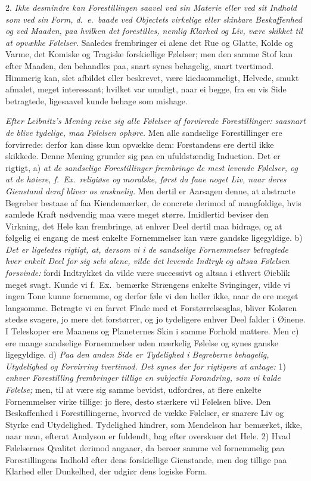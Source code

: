 \documentclass[12pt,a4paper]{article}
\newcommand{\opage}[1]{\marginnote{\footnotesize\textit{[#1]}}}
\begin{document}
2. \emph{Ikke desmindre kan Forestillingen saavel ved sin Materie eller ved sit Indhold
som ved sin Form, d.~e.\ baade ved Objectets virkelige eller skinbare Beskaffenhed og ved
Maaden, paa hvilken det forestilles, nemlig Klarhed og Liv, være skikket til at opvække
Følelser.} Saaledes frembringer ei alene det Rue og Glatte, Kolde og Varme, det Komiske og
Tragiske forskiellige Følelser; men den samme Stof kan efter Maaden, den behandles paa,
snart synes behagelig, snart tvertimod. Himmerig kan, slet afbildet eller beskrevet, være
kiedsommeligt, Helvede, smukt afmalet, meget interessant; hvilket var umuligt, naar ei
begge, fra en vis Side betragtede, ligesaavel kunde behage som mishage.

\emph{Efter Leibnitz's Mening reise sig alle Følelser af forvirrede Forestillinger:
saasnart de blive tydelige, maa Følelsen ophøre.} Men alle sandselige Forestillinger ere
forvirrede: derfor kan disse kun opvække dem: Forstandens ere dertil ikke skikkede. Denne
Mening grunder sig paa en ufuldstændig Induction. Det er rigtigt, a) \emph{at de
sandselige Forestillinger frembringe de mest levende Følelser, og at de
\opage{191} høiere, f.~Ex.\ religiøse og moralske, først da faae noget Liv, naar deres Gienstand deraf
bliver os anskuelig.} Men dertil er Aarsagen denne, at abstracte Begreber bestaae af faa
Kiendemærker, de concrete derimod af mangfoldige, hvis samlede Kraft nødvendig maa være
meget større. Imidlertid beviser den Virkning, det Hele kan frembringe, at enhver Deel
dertil maa bidrage, og at følgelig ei engang de mest enkelte Fornemmelser kan være gandske
ligegyldige. b) \emph{Det er ligeledes rigtigt, at, dersom vi i de sandselige Fornemmelser
betragtede hver enkelt Deel for sig selv alene, vilde det levende Indtryk og altsaa
Følelsen forsvinde:} fordi Indtrykket da vilde være successivt og altsaa i ethvert Øieblik
meget svagt. Kunde vi f.~Ex.\ bemærke Strængens enkelte Svinginger, vilde vi ingen Tone
kunne fornemme, og derfor føle vi den heller ikke, naar de ere meget langsomme. Betragte
vi en farvet Flade med et Forstørrelsesglas, bliver Koløren stedse svagere, jo mere det
forstørrer, og jo tydeligere enhver Deel falder i Øinene. I Teleskoper ere Maanens og
Planeternes Skin i samme Forhold mattere. Men c) ere mange sandselige Fornemmelser uden
mærkelig Følelse og synes ganske ligegyldige. d) \emph{Paa den anden Side er Tydelighed i
Begreberne behagelig, Utydelighed og Forvirring tvertimod. Det synes der%
\opage{192}for rigtigere at antage:} 1) \emph{enhver Forestilling frembringer tillige en subjectiv
Forandring, som vi kalde Følelse;} men, til at være sig samme bevidst, udfordres, at flere
enkelte Fornemmelser virke tillige: jo flere, desto stærkere vil Følelsen blive. Den
Beskaffenhed i Forestillingerne, hvorved de vække Følelser, er snarere Liv og Styrke end
Utydelighed. Tydelighed hindrer, som Mendelson har bemærket, ikke, naar man, efterat
Analyson er fuldendt, bag efter overskuer det Hele. 2) Hvad Følelsernes Qvalitet derimod
angaaer, da beroer samme vel fornemmelig paa Forestillingens Indhold efter dens
forskiellige Gienstande, men dog tillige paa Klarhed eller Dunkelhed, der udgiør dens
logiske Form.
\end{document}

